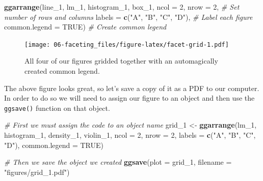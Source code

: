 \documentclass[
]{book}
\newenvironment{Shaded}{\begin{snugshade}}{\end{snugshade}}
\newcommand{\CommentTok}[1]{\textcolor[rgb]{0.56,0.35,0.01}{\textit{#1}}}
\newcommand{\DataTypeTok}[1]{\textcolor[rgb]{0.13,0.29,0.53}{#1}}
\newcommand{\DecValTok}[1]{\textcolor[rgb]{0.00,0.00,0.81}{#1}}
\newcommand{\KeywordTok}[1]{\textcolor[rgb]{0.13,0.29,0.53}{\textbf{#1}}}
\newcommand{\NormalTok}[1]{#1}
\newcommand{\OtherTok}[1]{\textcolor[rgb]{0.56,0.35,0.01}{#1}}
\newcommand{\StringTok}[1]{\textcolor[rgb]{0.31,0.60,0.02}{#1}}
\begin{document}
\begin{Shaded}
\begin{Highlighting}[]
\KeywordTok{ggarrange}\NormalTok{(line\_}\DecValTok{1}\NormalTok{, lm\_}\DecValTok{1}\NormalTok{, histogram\_}\DecValTok{1}\NormalTok{, box\_}\DecValTok{1}\NormalTok{, }
          \DataTypeTok{ncol =} \DecValTok{2}\NormalTok{, }\DataTypeTok{nrow =} \DecValTok{2}\NormalTok{, }\CommentTok{\# Set number of rows and columns}
          \DataTypeTok{labels =} \KeywordTok{c}\NormalTok{(}\StringTok{"A"}\NormalTok{, }\StringTok{"B"}\NormalTok{, }\StringTok{"C"}\NormalTok{, }\StringTok{"D"}\NormalTok{), }\CommentTok{\# Label each figure}
          \DataTypeTok{common.legend =} \OtherTok{TRUE}\NormalTok{) }\CommentTok{\# Create common legend}
\end{Highlighting}
\end{Shaded}

\begin{figure}
\centering
\texttt{[image: 06-faceting\_files/figure-latex/facet-grid-1.pdf]}
\caption{\label{fig:facet-grid}All four of our figures gridded together with an automagically created common legend.}
\end{figure}

The above figure looks great, so let's save a copy of it as a PDF to our computer. In order to do so we will need to assign our figure to an object and then use the \texttt{ggsave()} function on that object.

\begin{Shaded}
\begin{Highlighting}[]
\CommentTok{\# First we must assign the code to an object name}
\NormalTok{grid\_}\DecValTok{1}\NormalTok{ <{-}}\StringTok{ }\KeywordTok{ggarrange}\NormalTok{(lm\_}\DecValTok{1}\NormalTok{, histogram\_}\DecValTok{1}\NormalTok{, density\_}\DecValTok{1}\NormalTok{, violin\_}\DecValTok{1}\NormalTok{, }
                    \DataTypeTok{ncol =} \DecValTok{2}\NormalTok{, }\DataTypeTok{nrow =} \DecValTok{2}\NormalTok{, }
                    \DataTypeTok{labels =} \KeywordTok{c}\NormalTok{(}\StringTok{"A"}\NormalTok{, }\StringTok{"B"}\NormalTok{, }\StringTok{"C"}\NormalTok{, }\StringTok{"D"}\NormalTok{),}
                    \DataTypeTok{common.legend =} \OtherTok{TRUE}\NormalTok{)}

\CommentTok{\# Then we save the object we created}
\KeywordTok{ggsave}\NormalTok{(}\DataTypeTok{plot =}\NormalTok{ grid\_}\DecValTok{1}\NormalTok{, }\DataTypeTok{filename =} \StringTok{"figures/grid\_1.pdf"}\NormalTok{)}
\end{Highlighting}
\end{Shaded}
\end{document}

